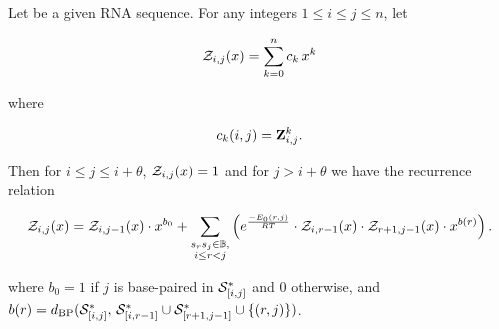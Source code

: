 \begin{theorem}
Let \seqN be a given RNA sequence.
For any integers $1 \leq i \leq j \leq n$, let

\begin{align}
{\mathcal Z}_{i,j}(x) = \sum_{k=0}^n c_k\,x^k
\end{align}

where

\begin{align}
c_k(i,j) = {\bf Z}^{k}_{i,j}.
\end{align}

Then for $i\leq j \leq i+\theta$, ${\mathcal Z}_{i,j}(x)=1$ and for
$j>i+\theta$ we have the recurrence relation

\begin{align}
\label{eq:fftbor:fftborNussPoly}
\emZ{i,j} = \emZ{i,j-1} \cdot x^{b_0} +
\sum_{\substack{s_r s_j \in \bpSet, \\ i\le r<j}}
\left(
\boltzNuss{r,j} \cdot \emZ{i,r-1} \cdot \emZ{r+1,j-1} \cdot x^{b(r)}
\right).
\end{align}

where $b_0 = 1$ if $j$ is base-paired in $\mathcal S^*_{[i,j]}$ and $0$ otherwise, and
$b(r) =
d_{\text{BP}}(\mathcal S^*_{[i,j]},\,\mathcal S^*_{[i,r-1]} \cup \mathcal S^*_{[r+1,j-1]} \cup \{(r,j)\})$.
\end{theorem}

